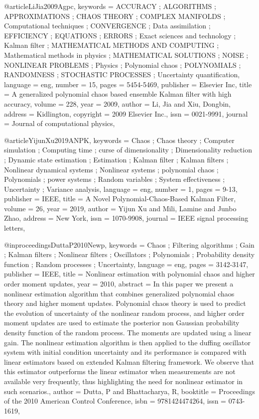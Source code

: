 @article{LiJia2009Agpc,
keywords = {ACCURACY ; ALGORITHMS ; APPROXIMATIONS ; CHAOS THEORY ; COMPLEX MANIFOLDS ; Computational techniques ; CONVERGENCE ; Data assimilation ; EFFICIENCY ; EQUATIONS ; ERRORS ; Exact sciences and technology ; Kalman filter ; MATHEMATICAL METHODS AND COMPUTING ; Mathematical methods in physics ; MATHEMATICAL SOLUTIONS ; NOISE ; NONLINEAR PROBLEMS ; Physics ; Polynomial chaos ; POLYNOMIALS ; RANDOMNESS ; STOCHASTIC PROCESSES ; Uncertainty quantification},
language = {eng},
number = {15},
pages = {5454-5469},
publisher = {Elsevier Inc},
title = {A generalized polynomial chaos based ensemble Kalman filter with high accuracy},
volume = {228},
year = {2009},
author = {Li, Jia and Xiu, Dongbin},
address = {Kidlington},
copyright = {2009 Elsevier Inc.},
issn = {0021-9991},
journal = {Journal of computational physics},
}

@article{YijunXu2019ANPK,
keywords = {Chaos ; Chaos theory ; Computer simulation ; Computing time ; curse of dimensionality ; Dimensionality reduction ; Dynamic state estimation ; Estimation ; Kalman filter ; Kalman filters ; Nonlinear dynamical systems ; Nonlinear systems ; polynomial chaos ; Polynomials ; power systems ; Random variables ; System effectiveness ; Uncertainty ; Variance analysis},
language = {eng},
number = {1},
pages = {9-13},
publisher = {IEEE},
title = {A Novel Polynomial-Chaos-Based Kalman Filter},
volume = {26},
year = {2019},
author = {Yijun Xu and Mili, Lamine and Junbo Zhao},
address = {New York},
issn = {1070-9908},
journal = {IEEE signal processing letters},
}

@inproceedings{DuttaP2010Newp,
keywords = {Chaos ; Filtering algorithms ; Gain ; Kalman filters ; Nonlinear filters ; Oscillators ; Polynomials ; Probability density function ; Random processes ; Uncertainty},
language = {eng},
pages = {3142-3147},
publisher = {IEEE},
title = {Nonlinear estimation with polynomial chaos and higher order moment updates},
year = {2010},
abstract = {In this paper we present a nonlinear estimation algorithm that combines generalized polynomial chaos theory and higher moment updates. Polynomial chaos theory is used to predict the evolution of uncertainty of the nonlinear random process, and higher order moment updates are used to estimate the posterior non Gaussian probability density function of the random process. The moments are updated using a linear gain. The nonlinear estimation algorithm is then applied to the duffing oscillator system with initial condition uncertainty and its performance is compared with linear estimators based on extended Kalman filtering framework. We observe that this estimator outperforms the linear estimator when measurements are not available very frequently, thus highlighting the need for nonlinear estimator in such scenarios.},
author = {Dutta, P and Bhattacharya, R},
booktitle = {Proceedings of the 2010 American Control Conference},
isbn = {9781424474264},
issn = {0743-1619},
}

